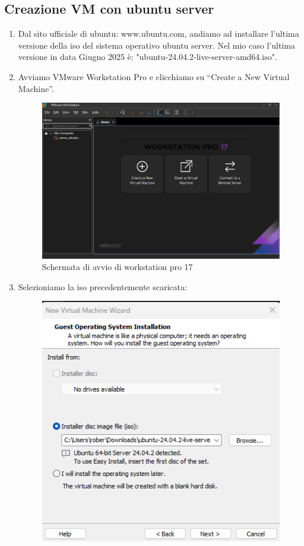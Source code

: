\documentclass[12pt,a4paper,twoside]{book}
\begin{document}
\subsection{Creazione VM con ubuntu server}
\begin{enumerate}
    \item Dal sito ufficiale di ubuntu: www.ubuntu.com, andiamo ad installare l'ultima versione della iso del sistema operativo ubuntu server.
    Nel mio caso l'ultima versione in data Giugno 2025 è: "ubuntu-24.04.2-live-server-amd64.iso".
    \item Avviamo VMware Workstation Pro e clicchiamo su “Create a New Virtual Machine”.
    \begin{figure}[H]
        \centering
        \includegraphics[width=.8\linewidth]{tesi/img/workstation_pro.png}
        \caption{Schermata di avvio di workstation pro 17}
        \label{fig:workstation_pro}
    \end{figure}
    \item Selezioniamo la iso precedentemente scaricata:
    \begin{figure}[H]
        \centering
        \includegraphics[width=.7\linewidth]{tesi/img/select_iso.png}

\end{figure}
\end{enumerate}
\end{document}
